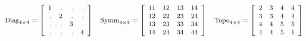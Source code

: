\begin{equation*}
\small
\mbox{Diag}_{4 \times 4} =
\left[
\begin{array}{rrrr}
  1 & . & . & . \\ 
  . & 2 & . & . \\ 
  . & . & 3 & . \\ 
  . & . & . & 4  
\end{array}
\right]
\quad
%
\mbox{Symm}_{4 \times 4} =
\left[
\begin{array}{rrrr}
  11 & 12 & 13 & 14 \\ 
  12 & 22 & 23 & 24 \\ 
  13 & 23 & 33 & 34 \\ 
  14 & 24 & 34 & 44  
\end{array}
\right]
\quad
%
\mbox{Topo}_{4 \times 4} =
\left[
\begin{array}{rrrr}
  2 & 3 & 4 & 4 \\ 
  3 & 3 & 4 & 4 \\ 
  4 & 4 & 5 & 5 \\ 
  4 & 4 & 5 & 1 
\end{array}
\right]
\end{equation*}

